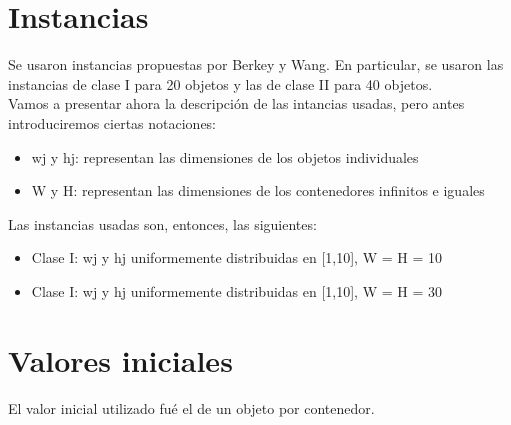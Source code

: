 \documentclass[a4paper,10pt]{article}
\begin{document}
\section{Instancias}
Se usaron instancias propuestas por Berkey y Wang. En particular, se usaron
las instancias de clase I para 20 objetos y las de clase II para 40 objetos.\\
Vamos a presentar ahora la descripción de las intancias usadas, pero antes introduciremos
ciertas notaciones:\\
\begin{itemize}
 \item wj y hj: representan las dimensiones de los objetos individuales
 \item W y H: representan las dimensiones de los contenedores infinitos e iguales
\end{itemize}
Las instancias usadas son, entonces, las siguientes:
\begin{itemize}
 \item Clase I: wj y hj uniformemente distribuidas en [1,10], W = H = 10
 \item Clase I: wj y hj uniformemente distribuidas en [1,10], W = H = 30
\end{itemize}

\section{Valores iniciales}
El valor inicial utilizado fué el de un objeto por contenedor.

\newpage
\end{document}
